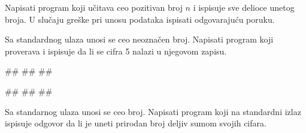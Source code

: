 \begin{Exercise}[label=v1.3_14] 
Napisati program koji učitava ceo pozitivan broj $n$ i ispisuje sve
 delioce
unetog broja. U slučaju greške pri unosu podataka ispisati
odgovarajuću poruku.
\end{Exercise}
\begin{Answer}[ref=v1.3_14]
\end{Answer}


\begin{Exercise}[label=p1.3_04] 
 Sa standardnog ulaza unosi se ceo neoznačen broj. Napisati program
 koji proverava i ispisuje da li se cifra 5 nalazi u njegovom zapisu.
 
\begin{miditest}
\begin{upotreba}{1}
#\naslovInt#
##
##
\end{upotreba}
\end{miditest}
\begin{miditest}
\begin{upotreba}{2}
#\naslovInt#
##
##
\end{upotreba}
\end{miditest}
\end{Exercise}
\begin{Answer}[ref=p1.3_04]
\end{Answer}


\begin{Exercise}[label=p1.7_] 
Sa standarnog ulaza unosi se ceo broj. Napisati program koji na
standardni izlaz ispisuje odgovor da li je uneti prirodan broj deljiv
sumom svojih cifara.\\ 
\end{Exercise}
\begin{Answer}[ref=p1.7_]
\end{Answer}


